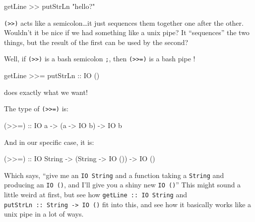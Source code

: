 \documentclass[]{article}
\newenvironment{Shaded}{}{}
\newcommand{\DataTypeTok}[1]{\textcolor[rgb]{0.56,0.13,0.00}{{#1}}}
\newcommand{\StringTok}[1]{\textcolor[rgb]{0.25,0.44,0.63}{{#1}}}
\newcommand{\OtherTok}[1]{\textcolor[rgb]{0.00,0.44,0.13}{{#1}}}
\newcommand{\FunctionTok}[1]{\textcolor[rgb]{0.02,0.16,0.49}{{#1}}}
\newcommand{\NormalTok}[1]{{#1}}
\begin{document}
\begin{Shaded}
\begin{Highlighting}[]
\NormalTok{getLine }\FunctionTok{>>} \NormalTok{putStrLn }\StringTok{"hello?"}
\end{Highlighting}
\end{Shaded}

\texttt{(\textgreater{}\textgreater{})} acts like a semicolon\ldots{}it just
sequences them together one after the other. Wouldn't it be nice if we had
something like a unix pipe? It ``sequences'' the two things, but the result of
the first can be used by the second?

Well, if \texttt{(\textgreater{}\textgreater{})} is a bash semicolon \texttt{;},
then \texttt{(\textgreater{}\textgreater{}=)} is a bash pipe
\texttt{\textbar{}}!

\begin{Shaded}
\begin{Highlighting}[]
\NormalTok{getLine }\FunctionTok{>>=} \NormalTok{putStrLn}
\OtherTok{                      ::} \DataTypeTok{IO} \NormalTok{()}
\end{Highlighting}
\end{Shaded}

does exactly what we want!

The type of \texttt{(\textgreater{}\textgreater{}=)} is:

\begin{Shaded}
\begin{Highlighting}[]
\OtherTok{(>>=) ::} \DataTypeTok{IO} \NormalTok{a }\OtherTok{->} \NormalTok{(a }\OtherTok{->} \DataTypeTok{IO} \NormalTok{b) }\OtherTok{->} \DataTypeTok{IO} \NormalTok{b}
\end{Highlighting}
\end{Shaded}

And in our specific case, it is:

\begin{Shaded}
\begin{Highlighting}[]
\OtherTok{(>>=) ::} \DataTypeTok{IO} \DataTypeTok{String} \OtherTok{->} \NormalTok{(}\DataTypeTok{String} \OtherTok{->} \DataTypeTok{IO} \NormalTok{()) }\OtherTok{->} \DataTypeTok{IO} \NormalTok{()}
\end{Highlighting}
\end{Shaded}

Which says, ``give me an \texttt{IO\ String} and a function taking a
\texttt{String} and producing an \texttt{IO\ ()}, and I'll give you a shiny new
\texttt{IO\ ()}'' This might sound a little weird at first, but see how
\texttt{getLine\ ::\ IO\ String} and
\texttt{putStrLn\ ::\ String\ -\textgreater{}\ IO\ ()} fit into this, and see
how it basically works like a unix pipe in a lot of ways.
\end{document}
